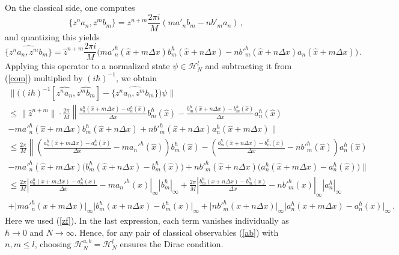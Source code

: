 \documentclass[12pt,a4paper]{article}
\numberwithin{equation}{section}
\theoremstyle{theorem}
\theoremstyle{remark}
\newcommand{\hh}{\mathcal{H}}
\begin{document}
   On  the classical side, one computes
$$
\{z^na_n,z^mb_m\}=z^{n+m}\frac{2\pi i}{M}(ma'_n b_m-nb'_ma_n)\,,
$$
and quantizing this yields
$$
\widehat{\{z^na_n,z^mb_m\}}=\hat z^{n+m}\frac{2\pi i}{M}\big(ma'^\hbar_n(\hat x+m\Delta x) b^\hbar_m(\hat x +n\Delta x)-nb'^\hbar_m(\hat x+n\Delta x)a_n(\hat x+m\Delta x)\big) \,.
$$
Applying this operator to a normalized state $\psi\in \hh_N^l$ and subtracting it from (\ref{com}) multiplied by $(i\hbar)^{-1}$, we obtain
$$
\begin{array}{c}
\displaystyle \big\|\big((i\hbar)^{-1}[\widehat{z^na_n}, \widehat{z^mb_m}] -\widehat{\{z^na_n,z^mb_m\}}\big)\psi\big\|\\[7mm]
\displaystyle \leq\big\|\hat z^{n+m}\big\| \cdot\frac{2\pi}{M}\left\|\frac{a_n^\hbar(\hat x+m\Delta x)-a_n^\hbar(\hat x)}{\Delta x}b_m^\hbar(\hat x)- \frac{b_m^\hbar(\hat x+n\Delta x)-b_m^\hbar(\hat x)}{\Delta x}a_n^\hbar(\hat x) \right.\\[7mm]
\displaystyle -ma'^\hbar_n(\hat x+m\Delta x) b^\hbar_m(\hat x +n\Delta x)+nb'^\hbar_m(\hat x+n\Delta x)a^\hbar_n(\hat x+m\Delta x)\Big\|\\[7mm]
\displaystyle \leq\frac{2\pi}{M}\left\|\left(\frac{a_n^\hbar(\hat x+m\Delta x)-a_n^\hbar(\hat x)}{\Delta x}-ma_n'^\hbar(\hat x)\right)b_m^\hbar(\hat x)- \left(\frac{b_m^\hbar(\hat x+n\Delta x)-b_m^\hbar(\hat x)}{\Delta x}-nb'^\hbar_m(\hat x)\right)a_n^\hbar(\hat x) \right.\\[7mm]
\displaystyle -ma'^\hbar_n(\hat x+m\Delta x) \big(b^\hbar_m(\hat x +n\Delta x)-b^\hbar_m(\hat x)\big)+nb'^\hbar_m(\hat x+n\Delta x)\big( a^\hbar_n(\hat x+m\Delta x) - a^\hbar_n(\hat x)\big)\Big\|\\[7mm]
\displaystyle\leq\frac{2\pi}{M}\left|\frac{a_n^\hbar( x+m\Delta x)-a_n^\hbar( x)}{\Delta x}-ma_n'^\hbar( x)\right|_\infty |b_m^\hbar|_\infty+ 
\frac{2\pi}{M}\left|\frac{b_m^\hbar(x+n\Delta x)-b_m^\hbar( x)}{\Delta x}-nb'^\hbar_m( x)\right|_\infty |a_n^\hbar|_\infty \\[7mm]
\displaystyle+\big| ma'^\hbar_n( x+m\Delta x)\big |_\infty \big|b^\hbar_m(x +n\Delta x)-b^\hbar_m( x)\big|_\infty+\big|nb'^\hbar_m( x+n\Delta x)\big|_\infty\big| a^\hbar_n(x+m\Delta x) - a^\hbar_n( x)\big|_\infty\,.
\end{array}
$$
Here we used (\ref{zf}). In the last expression, each term vanishes individually as $\hbar\to 0$ and $N\to \infty$. Hence, for any pair of classical observables (\ref{ab}) with $n,m\leq l$, choosing $\hh^{a,b}_N=\hh^l_N$ ensures the Dirac condition. 
\end{document}

